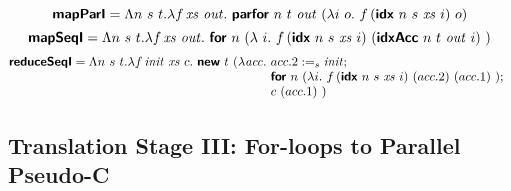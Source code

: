 \begin{displaymath}
  \bm{\mathsf{mapParI}}
  =
  \Lambda n~s~t.\lambda f\,\mathit{xs}~\mathit{out}.~
  \bm{\mathsf{parfor}}~n~t~\mathit{out}~(\lambda i~o.~f\,(\bm{\mathsf{idx}}~n~s~\mathit{xs}~i)~o)
\end{displaymath}
\begin{displaymath}
  \bm{\mathsf{mapSeqI}}
  =
  \Lambda n~s~t.\lambda f\,\mathit{xs}~\mathit{out}.~
  \bm{\mathsf{for}}~n~(\lambda~i.~f\,(\bm{\mathsf{idx}}~n~s~\mathit{xs}~i)~(\bm{\mathsf{idxAcc}}~n~t~\mathit{out}~i)\ )
\end{displaymath}
\begin{displaymath}
  \prim{reduceSeqI}
  =
  \Lambda n~\dtone~\dttwo.\lambda f\,\mathit{init}~\mathit{xs}~c.~\prim{new}~\dttwo~(\lambda \mathit{acc}.~
    \begin{array}[t]{@{}l}
    \projtwo{acc} :=_{\dtone} \mathit{init};\\
    \prim{for}~n~(\lambda i.~f\,(\ei)~(\projtwo{acc})~(\projone{acc})\ );\\
    c~(\projone{acc})\ )
    \end{array}
\end{displaymath}

\clearpage

\subsection{Translation Stage III: For-loops to Parallel Pseudo-C}
\label{sec:translation-iii}


\newcommand{\codegenComm}[1]{\textsc{CodeGen}_{\mathsf{comm}}(#1)}
\newcommand{\codegenAcc}[2]{\textsc{CodeGen}_{\mathsf{acc}[#1]}(#2)}
\newcommand{\codegenExp}[2]{\textsc{CodeGen}_{\mathsf{exp}[#1]}(#2)}
\newcommand{\codegenData}[1]{\textsc{CodeGen}_{\mathsf{\datatype}}(#1)}

